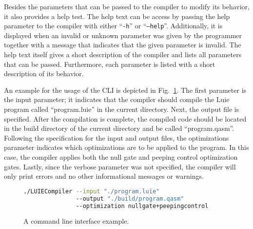 Besides the parameters that can be passed to the compiler to modify its behavior, it also provides a help test. The help text can be access by passing the help parameter to the compiler with either ``\texttt{-h}'' or ``\texttt{--help}''. Additionally, it is displayed when an invalid or unknown parameter was given by the programmer together with a message that indicates that the given parameter is invalid. The help text itself gives a short description of the compiler and lists all parameters that can be passed. Furthermore, each parameter is listed with a short description of its behavior.

An example for the usage of the CLI is depicted in Fig.~\ref{fig:concept_cli_example}. The first parameter is the input parameter; it indicates that the compiler should compile the Luie program called ``program.luie'' in the current directory. Next, the output file is specified. After the compilation is complete, the compiled code should be located in the build directory of the current directory and be called ``program.qasm''. Following the specification for the input and output files, the optimizations parameter indicates which optimizations are to be applied to the program. In this case, the compiler applies both the null gate and peeping control optimization gates. Lastly, since the verbose parameter was not specified, the compiler will only print errors and no other informational messages or warnings.
\begin{figure}[htp]
    \centering
    \begin{lstlisting}[language=bash, style=bashstyle]
./LUIECompiler --input "./program.luie" 
               --output "./build/program.qasm" 
               --optimization nullgate+peepingcontrol
    \end{lstlisting}
    \caption{A command line interface example.}
    \label{fig:concept_cli_example}
\end{figure}